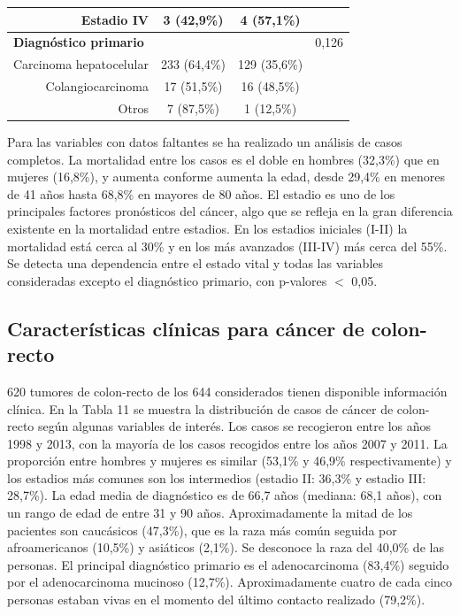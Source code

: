 \begin{table}[H]
\begin{tabular}{rccc}
		Estadio IV                                        & 3 (42,9\%)     & 4 (57,1\%)          &                      \\ \hline
		\multicolumn{1}{l}{\textbf{Diagnóstico primario}} &                &                     & 0,126                \\
		Carcinoma hepatocelular                           & 233 (64,4\%)   & 129 (35,6\%)        &                      \\
		Colangiocarcinoma                                 & 17 (51,5\%)    & 16 (48,5\%)         &                      \\
		Otros                                             & 7 (87,5\%)     & 1 (12,5\%)          &                      \\ \hline
	\end{tabular}
\end{table}

Para las variables con datos faltantes se ha realizado un análisis de casos completos.  La mortalidad entre los casos es el doble en hombres (32,3\%) que en mujeres (16,8\%), y aumenta conforme aumenta la edad, desde 29,4\% en menores de 41 años hasta 68,8\% en mayores de 80 años. El estadio es uno de los principales factores pronósticos del cáncer, algo que se refleja en la gran diferencia existente en la mortalidad entre estadios. En los estadios iniciales (I-II) la mortalidad está cerca al 30\% y en los más avanzados (III-IV) más cerca del 55\%. Se detecta una dependencia entre el estado vital y todas las variables consideradas excepto el diagnóstico primario, con p-valores $<$ 0,05.

\subsection{Características clínicas para cáncer de colon-recto}

620 tumores de colon-recto de los 644 considerados tienen disponible información clínica. En la Tabla 11 se muestra  la distribución de casos de cáncer de colon-recto según algunas variables de interés. Los casos se recogieron entre los años 1998 y 2013, con la mayoría de los casos recogidos entre los años 2007 y 2011. La proporción entre hombres y mujeres es similar (53,1\% y 46,9\% respectivamente) y los estadios más comunes son los intermedios (estadio II: 36,3\% y estadio III: 28,7\%). La edad media de diagnóstico es de 66,7 años (mediana: 68,1 años), con un rango de edad de entre 31 y 90 años. Aproximadamente la mitad de los pacientes son caucásicos (47,3\%), que es la raza más común seguida por afroamericanos (10,5\%) y asiáticos (2,1\%). Se desconoce la raza del 40,0\% de las personas. El principal diagnóstico primario es el adenocarcinoma (83,4\%) seguido por el adenocarcinoma mucinoso (12,7\%). Aproximadamente cuatro de cada cinco personas estaban vivas en el momento del último contacto realizado (79,2\%).\\

